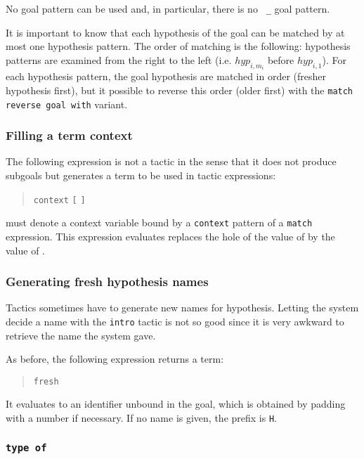 \ErrMsg {}

  No goal pattern can be used and, in particular, there is no {\tt
    \_} goal pattern.

\medskip

It is important to know that each hypothesis of the goal can be
matched by at most one hypothesis pattern. The order of matching is
the following: hypothesis patterns are examined from the right to the
left (i.e. $hyp_{i,m_i}$ before $hyp_{i,1}$). For each hypothesis
pattern, the goal hypothesis are matched in order (fresher hypothesis
first), but it possible to reverse this order (older first) with
the {\tt match reverse goal with} variant.

\subsubsection{Filling a term context}

The following expression is not a tactic in the sense that it does not
produce subgoals but generates a term to be used in tactic
expressions:
\begin{quote}
{\tt context} {\ident} {\tt [} {\tacexpr} {\tt ]}
\end{quote}
{\ident} must denote a context variable bound by a {\tt context}
pattern of a {\tt match} expression. This expression evaluates
replaces the hole of the value of {\ident} by the value of
{\tacexpr}.

\ErrMsg {}


\subsubsection{Generating fresh hypothesis names}

Tactics sometimes have to generate new names for hypothesis. Letting
the system decide a name with the {\tt intro} tactic is not so good
since it is very awkward to retrieve the name the system gave.

As before, the following expression returns a term:
\begin{quote}
{\tt fresh} {\qstring}
\end{quote}
It evaluates to an identifier unbound in the goal, which is obtained
by padding {\qstring} with a number if necessary. If no name is given,
the prefix is {\tt H}.

\subsubsection{{\tt type of} {\term}}

